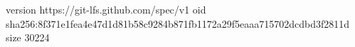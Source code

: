 version https://git-lfs.github.com/spec/v1
oid sha256:8f371e1fea4e47d1d81b58c9284b871fb1172a29f5eaaa715702dcdbd3f2811d
size 30224
